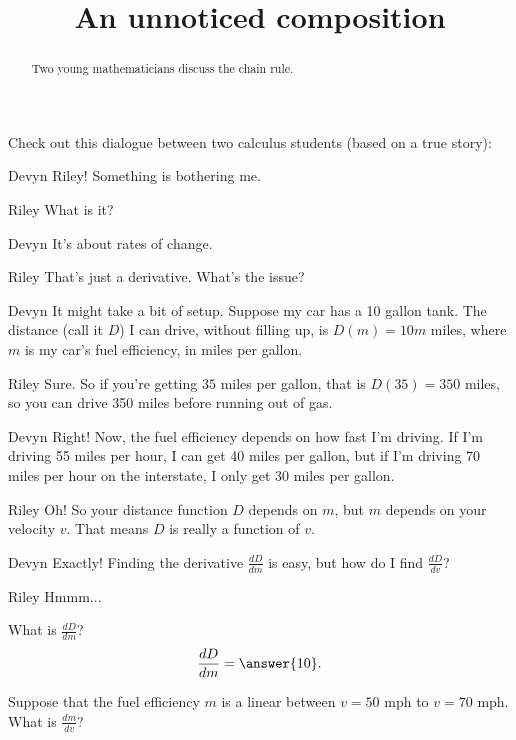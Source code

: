 \documentclass{ximera}
\title[Break-Ground:]{An unnoticed composition}
\begin{document}
\begin{abstract}
Two young mathematicians discuss the chain rule.
\end{abstract}
\maketitle

Check out this dialogue between two calculus students (based on a true
story):

\begin{dialogue}
\item[Devyn] Riley! Something is bothering me. 
\item[Riley] What is it?
\item[Devyn]  It's about rates of change.
\item[Riley] That's just a derivative.  What's the issue?
\item[Devyn]  It might take a bit of setup.  Suppose my car has a 10 gallon tank.  The distance (call it $D$) I can drive, without filling up, is $D(m)=10m$ miles, where $m$ is my car's fuel
			efficiency, in miles per gallon.
\item[Riley]  Sure.  So if you're getting $35$ miles per gallon, that is $D(35) = 350$ miles, so you can drive 350 miles before running out of gas.
\item[Devyn] Right!  Now, the fuel efficiency depends on how fast I'm driving.  If I'm driving 55 miles per hour, I can get 40 miles per gallon, but if I'm driving 70 miles per hour on the interstate,
			I only get 30 miles per gallon.
\item[Riley]  Oh!  So your distance function $D$ depends on $m$, but $m$ depends on your velocity $v$.  That means $D$ is really a function of $v$.
\item[Devyn]  Exactly!  Finding the derivative $\frac{dD}{dm}$ is easy, but how do I find $\frac{dD}{dv}$?
\item[Riley]  Hmmm...
\end{dialogue}



\begin{question}
	What is $\frac{dD}{dm}$?
	\[ \frac{dD}{dm} = \answer{10}. \]
\end{question}

\begin{question}
	Suppose that the fuel efficiency $m$ is a linear between $v = 50$ mph to $v= 70$ mph.  What is $\frac{dm}{dv}$?
	\begin{multipleChoice}
	\end{multipleChoice}
\end{question}

%
\end{document}
